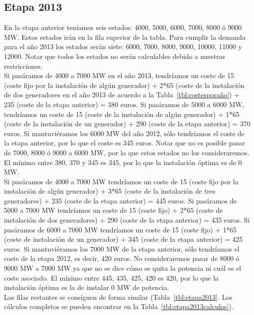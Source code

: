 \documentclass[12pt,a4paper,twoside,openright,titlepage,final]{article}
\begin{document}
\subsection{Etapa 2013}

En la etapa anterior teníamos seis estados: 4000, 5000, 6000, 7000, 8000 ó 9000 MW. Estos estados irán en la fila superior de la tabla. Para cumplir la demanda para el año 2013 los estados serán siete: 6000, 7000, 8000, 9000, 10000, 11000 y 12000. Notar que todos los estados no serán calculables debido a nuestras restricciones.\\

Si pasáramos de 4000 a 7000 MW en el año 2013, tendríamos un coste de 15 (coste fijo por la instalación de algún generador) + 2*65 (coste de la instalación de dos generadores en el año 2013 de acuerdo a la Tabla~\ref{tbl:costesporaño}) + 235 (coste de la etapa anterior) = 380 euros. Si pasáramos de 5000 a 6000 MW, tendríamos un coste de 15 (coste de la instalación de algún generador) + 1*65 (coste de la instalación de un generador) + 290 (coste de la etapa anterior) = 370 euros. Si mantuviéramos los 6000 MW del año 2012, sólo tendríamos el coste de la etapa anterior, por lo que el coste es 345 euros. Notar que no es posible pasar de 7000, 8000 ó 9000 a 6000 MW, por lo que estos estados no los consideraremos. El mínimo entre 380, 370 y 345 es 345, por lo que la instalación óptima es de 0 MW.\\

Si pasáramos de 4000 a 7000 MW tendríamos un coste de 15 (coste fijo por la instalación de algún generador) + 3*65 (coste de la instalación de tres generadores) + 235 (coste de la etapa anterior) = 445 euros. Si pasáramos de 5000 a 7000 MW tendríamos un coste de 15 (coste fijo) + 2*65 (coste de instalación de dos generadores) + 290 (coste de la etapa anterior) = 435 euros. Si pasáramos de 6000 a 7000 MW tendríamos un coste de 15 (coste fijo) + 1*65 (coste de instalación de un generador) + 345 (coste de la etapa anterior) = 425 euros. Si mantuviéramos los 7000 MW de la etapa anterior, sólo tendríamos el coste de la etapa 2012, es decir, 420 euros. No consideraremos pasar de 8000 ó 9000 MW a 7000 MW ya que no se dice cómo se quita la potencia ni cuál es el coste asociado. El mínimo entre 445, 435, 425, 420 es 420, por lo que la instalación óptima es la de instalar 0 MW de potencia.\\

Las filas restantes se consiguen de forma similar (Tabla~\ref{tbl:etapa2013}. Los cálculos completos se pueden encontrar en la Tabla~\ref{tbl:etapa2013calculos}).\\ 
\end{document}

